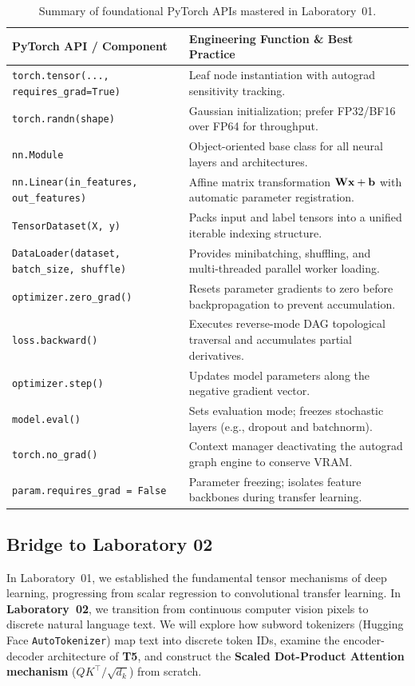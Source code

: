 \documentclass[../labs.tex]{subfiles}
\begin{document}
\begin{table}[htbp]
\centering
\small
\begin{tabularx}{\textwidth}{l >{\raggedright\arraybackslash}X}
\toprule
\textbf{PyTorch API / Component} & \textbf{Engineering Function \& Best Practice} \\
\midrule
\texttt{torch.tensor(..., requires\_grad=True)} & Leaf node instantiation with autograd sensitivity tracking. \\
\texttt{torch.randn(shape)} & Gaussian initialization; prefer FP32/BF16 over FP64 for throughput. \\
\texttt{nn.Module} & Object-oriented base class for all neural layers and architectures. \\
\texttt{nn.Linear(in\_features, out\_features)} & Affine matrix transformation $\mathbf{W} \mathbf{x} + \mathbf{b}$ with automatic parameter registration. \\
\texttt{TensorDataset(X, y)} & Packs input and label tensors into a unified iterable indexing structure. \\
\texttt{DataLoader(dataset, batch\_size, shuffle)} & Provides minibatching, shuffling, and multi-threaded parallel worker loading. \\
\texttt{optimizer.zero\_grad()} & Resets parameter gradients to zero before backpropagation to prevent accumulation. \\
\texttt{loss.backward()} & Executes reverse-mode DAG topological traversal and accumulates partial derivatives. \\
\texttt{optimizer.step()} & Updates model parameters along the negative gradient vector. \\
\texttt{model.eval()} & Sets evaluation mode; freezes stochastic layers (e.g., dropout and batchnorm). \\
\texttt{torch.no\_grad()} & Context manager deactivating the autograd graph engine to conserve VRAM. \\
\texttt{param.requires\_grad = False} & Parameter freezing; isolates feature backbones during transfer learning. \\
\bottomrule
\end{tabularx}
\caption{Summary of foundational PyTorch APIs mastered in Laboratory~01.}
\label{tab:lab01_summary}
\end{table}

\subsection{Bridge to Laboratory 02}
In Laboratory~01, we established the fundamental tensor mechanisms of deep learning, progressing from scalar regression to convolutional transfer learning. In \textbf{Laboratory~02}, we transition from continuous computer vision pixels to discrete natural language text. We will explore how subword tokenizers (Hugging Face \texttt{AutoTokenizer}) map text into discrete token IDs, examine the encoder-decoder architecture of \textbf{T5}, and construct the \textbf{Scaled Dot-Product Attention mechanism} ($QK^\top / \sqrt{d_k}$) from scratch.
\end{document}
